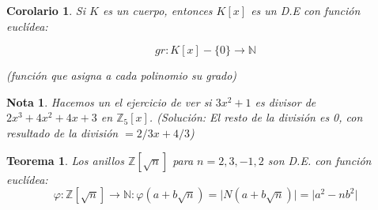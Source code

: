 \documentclass[11pt, a4paper, titlepage]{article}
\providecommand{\ent}{\mathbb{Z}}
\providecommand{\nat}{\mathbb{N}}
\providecommand{\abs}[1]{\lvert#1\rvert}
\theoremstyle{theorem-style}
\newtheorem*{nth}{Teorema}
\newtheorem{ncor}{Corolario}
\theoremstyle{definition-style}
\theoremstyle{remark-style}
\newtheorem*{nota}{Nota}
\theoremstyle{example-style}
\begin{document}
\begin{ncor}
	Si $K$ es un cuerpo, entonces $K[x]$ es un D.E con función euclídea:
	
	\[
	gr: K[x]-\{0\} \to \nat
	\]
	
(función que asigna a cada polinomio su grado)
\end{ncor}

\begin{nota}
	Hacemos un el ejercicio de ver si $3x^2 +1$ es divisor de $2x^3 + 4x^2 +4x +3$ en $\ent _5[x]$. (Solución: El resto de la división es 0, con resultado de la división $= 2/3 x + 4/3$)
\end{nota}


\begin{nth}
	Los anillos $\ent[\sqrt{n}]$ para $n=2,3,-1,2$ son D.E. con función euclídea:
	\[
	\varphi: \ent[\sqrt{n}] \to \nat : \varphi(a+b\sqrt{n}) = \abs{N(a+b\sqrt{n})} = \abs{a^2 - nb^2}
	\]
	
	
\end{nth}
\end{document}
